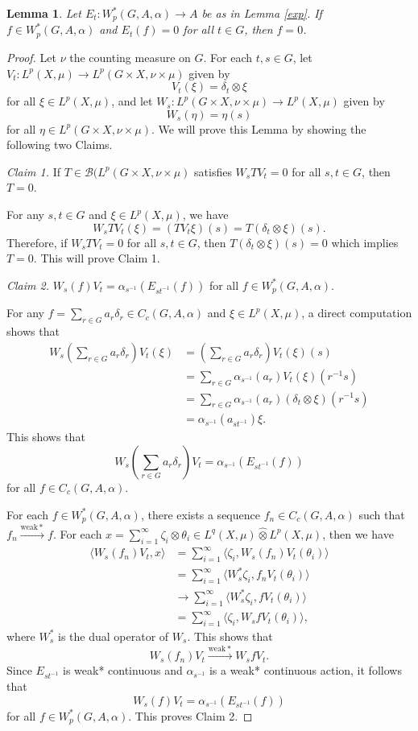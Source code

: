 \documentclass[reqno,11pt]{amsart}
\theoremstyle{plain}
\newtheorem{lem}[thm]{Lemma}
\theoremstyle{definition}
\theoremstyle{remark}
\newcommand{\la}{\langle}
\newcommand{\ra}{\rangle}
\begin{document}
\begin{lem}\label{inj}
Let $E_t:W^*_p(G,A,\alpha)\rightarrow A$ be as in Lemma \ref{exp}. If $f\in W^*_p(G,A,\alpha)$ and $E_t(f)=0$ for all $t\in G$, then $f=0$.
\end{lem}
\begin{proof}
Let $\nu$ the counting measure on $G$. For each $t,s\in G$, let $V_t:L^p(X,\mu)\rightarrow L^p(G\times X,\nu\times\mu)$ given by $$V_t(\xi)=\delta_t\otimes\xi$$ for all $\xi\in L^p(X,\mu)$, and let $W_s:L^p(G\times X,\nu\times\mu)\rightarrow L^p(X,\mu)$ given by $$W_s(\eta)=\eta(s)$$ for all $\eta\in L^p(G\times X,\nu\times\mu)$.
We will prove this Lemma by showing the following two Claims.

{\it Claim 1.} If $T\in \mathcal{B}(L^p(G\times X,\nu\times\mu)$ satisfies $W_sTV_t=0$ for all $s,t\in G$, then $T=0$.

For any $s,t\in G$ and $\xi\in L^p(X,\mu)$, we have $$W_sTV_t(\xi)=(TV_t\xi)(s)=T(\delta_t\otimes\xi)(s).$$
Therefore, if $W_sTV_t=0$ for all $s,t\in G$, then $T(\delta_t\otimes\xi)(s)=0$ which implies $T=0$.
This will prove Claim 1.

{\it Claim 2.} $W_s(f)V_t=\alpha_{s^{-1}}(E_{st^{-1}}(f))$ for all $f\in W^*_p(G,A,\alpha)$.

For any $f=\sum_{r\in G}a_r\delta_r\in C_c(G,A,\alpha)$ and $\xi\in L^p(X,\mu)$, a direct computation shows that
$$\begin{aligned} W_s(\sum_{r\in G}a_r\delta_r)V_t(\xi)
 &=(\sum_{r\in G}a_r\delta_r)V_t(\xi)(s) \\
 &=\sum_{r\in G}\alpha_{s^{-1}}(a_r)V_t(\xi)(r^{-1}s)\\
 &=\sum_{r\in G}\alpha_{s^{-1}}(a_r)(\delta_t\otimes \xi)(r^{-1}s)\\
 &=\alpha_{s^{-1}}(a_{st^{-1}})\xi. \end{aligned}$$
This shows that $$W_s(\sum_{r\in G}a_r\delta_r)V_t=\alpha_{s^{-1}}(E_{st^{-1}}(f))$$ for all $f\in C_c(G,A,\alpha)$.

For each $f\in W^*_p(G,A,\alpha)$, there exists a sequence $f_n\in C_c(G,A,\alpha)$ such that $f_n\xrightarrow{\mathrm{weak}*}f$.
For each $x=\sum_{i=1}^\infty \zeta_i\otimes \theta_i\in L^q(X,\mu)\widehat{\otimes}L^p(X,\mu)$, then we have
$$\begin{aligned} \la W_s(f_n)V_t,x\ra
 &=\sum_{i=1}^\infty \la \zeta_i, W_s(f_n)V_t(\theta_i)\ra \\
 &=\sum_{i=1}^\infty \la W_s^*\zeta_i,f_nV_t(\theta_i)\ra\\
 &\rightarrow \sum_{i=1}^\infty \la W_s^*\zeta_i,fV_t(\theta_i)\ra\\
 &=\sum_{i=1}^\infty \la \zeta_i, W_sfV_t(\theta_i)\ra, \end{aligned}$$
where $W_s^*$ is the dual operator of $W_s$. This shows that $$W_s(f_n)V_t\xrightarrow{\mathrm{weak}*} W_sfV_t.$$
Since $E_{st^{-1}}$ is weak* continuous and $\alpha_{s^{-1}}$ is a weak* continuous action, it follows that $$W_s(f)V_t=\alpha_{s^{-1}}(E_{st^{-1}}(f))$$ for all $f\in W^*_p(G,A,\alpha)$. This proves Claim 2.
\end{proof}
\end{document}

